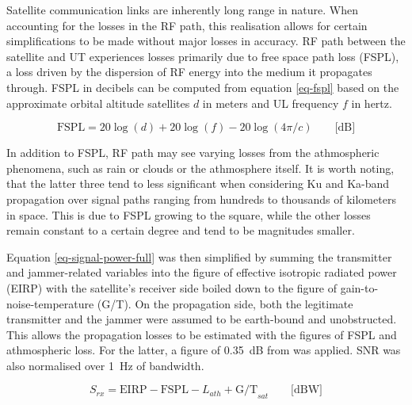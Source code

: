 \documentclass[english, 12pt, a4paper, elec, utf8, a-1b, online]{aaltothesis}
\begin{document}
Satellite communication links are inherently long range in nature. When accounting for the losses in the RF path, this realisation allows for certain simplifications to be made without major losses in accuracy. RF path between the satellite and UT experiences losses primarily due to free space path loss (FSPL), a loss driven by the dispersion of RF energy into the medium it propagates through. FSPL in decibels can be computed from equation \ref{eq-fspl} based on the approximate orbital altitude satellites $d$ in meters and UL frequency $f$ in hertz.

\begin{equation} \label{eq-fspl}
  \mathrm{FSPL} = 20\log(d)+20\log(f)-20\log(4\pi / c) \qquad \text{[dB]}
\end{equation}

In addition to FSPL, RF path may see varying losses from the athmospheric phenomena, such as rain or clouds or the athmosphere itself. It is worth noting, that the latter three tend to less significant when considering Ku and Ka-band propagation over signal paths ranging from hundreds to thousands of kilometers in space. This is due to FSPL growing to the square, while the other losses remain constant to a certain degree and tend to be magnitudes smaller.

Equation \ref{eq-signal-power-full} was then simplified by summing the transmitter and jammer-related variables into the figure of effective isotropic radiated power (EIRP) with the satellite's receiver side boiled down to the figure of gain-to-noise-temperature (G/T). On the propagation side, both the legitimate transmitter and the jammer were assumed to be earth-bound and unobstructed. This allows the propagation losses to be estimated with the figures of FSPL and athmospheric loss. For the latter, a figure of \SI{0.35}{\deci\bel} from \cite{kymeta2019link} was applied. SNR was also normalised over \SI{1}{\hertz} of bandwidth.

\begin{equation} \label{eq-signal-power-simplified}
  S_{rx} = \mathrm{EIRP} - \mathrm{FSPL} - L_{ath} + \mathrm{G/T}_{sat} \qquad \text{[dBW]}
\end{equation}
\end{document}
